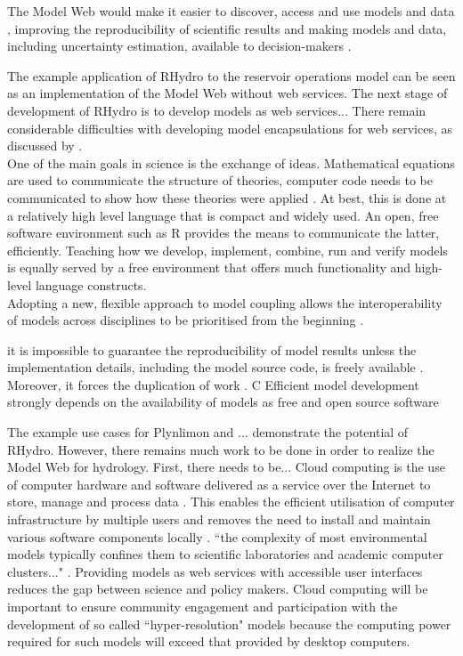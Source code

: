 \documentclass{icldt}\usepackage[]{graphicx}\usepackage[]{color}
\begin{document}
The Model Web would make it easier to discover, access and use models and data \citep{schade2012}, improving the reproducibility of scientific results and making models and data, including uncertainty estimation, available to decision-makers \citep{nativi2013}.

The example application of RHydro to the reservoir operations model can be seen as an implementation of the Model Web without web services. The next stage of development of RHydro is to develop models as web services... There remain considerable difficulties with developing model encapsulations for web services, as discussed by \citet{yue2015}. \\

One of the main goals in science is the exchange of ideas. Mathematical equations are used to communicate the structure of theories, computer code needs to be communicated to show how these theories were applied \citep{buytaert2008}. At best, this is done at a relatively high level language that is compact and widely used. An open, free software environment such as R provides the means to communicate the latter, efficiently. Teaching how we develop, implement, combine, run and verify models is equally served by a free environment that offers much functionality and high-level language constructs. \\

Adopting a new, flexible approach to model coupling allows the interoperability of models across disciplines to be prioritised from the beginning \citep{goodall2011}. 

it is impossible to guarantee the reproducibility of model results unless the implementation details, including the model source code, is freely available \citep{ince2012}. Moreover, it forces the duplication of work \citep{}. C
Efficient model development strongly depends on the availability of models as free and open source software

The example use cases for Plynlimon and ... demonstrate the potential of RHydro. However, there remains much work to be done in order to realize the Model Web for hydrology. First, there needs to be... Cloud computing is the use of computer hardware and software delivered as a service over the Internet to store, manage and process data \citep{}. This enables the efficient utilisation of computer infrastructure by multiple users and removes the need to install and maintain various software components locally \citep{burger2012}. ``the complexity of most environmental models typically confines them to scientific laboratories and academic computer clusters..." \citep{buytaert2012}. %
Providing models as web services with accessible user interfaces reduces the gap between science and policy makers. Cloud computing will be important to ensure community engagement and participation with the development of so called ``hyper-resolution" models because the computing power required for such models will exceed that provided by desktop computers. \\
\end{document}
